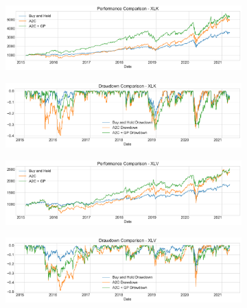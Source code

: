 \documentclass[12pt]{article}
\begin{document}
\begin{figure}[h]
	\centering
	\begin{subfigure}{\linewidth}
		\centering
		\includegraphics[width=\linewidth]{../src/figures/xlk_performance_comparison.pdf}
	\end{subfigure}
	\begin{subfigure}{\linewidth}
		\centering
		\includegraphics[width=\linewidth]{../src/figures/xlk_drawdowns_comparison.pdf}
	\end{subfigure}
	\caption{}
	\label{fig:xlk}
\end{figure}

\begin{figure}[h]
	\centering
	\begin{subfigure}{\linewidth}
		\centering
		\includegraphics[width=\linewidth]{../src/figures/xlv_performance_comparison.pdf}
	\end{subfigure}
	\begin{subfigure}{\linewidth}
		\centering
		\includegraphics[width=\linewidth]{../src/figures/xlv_drawdowns_comparison.pdf}
	\end{subfigure}
	\caption{}
	\label{fig:xlv}
\end{figure}
\end{document}
